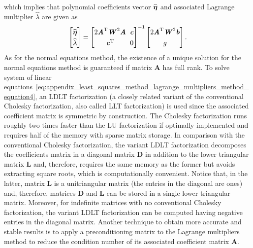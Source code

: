 which implies that polynomial coefficients vector $\widehat{\boldsymbol{\eta}}$ and associated Lagrange multiplier $\widehat{\lambda}$ are given as
\begin{equation}
\label{eq:appendix_least_squares_method_lagrange_multipliers_method_equation5}
\setlength\arraycolsep{0.1cm}
\renewcommand{\arraystretch}{1.3}
\begin{bmatrix}
\widehat{\bs{\eta}}\\
\widehat{\lambda}
\end{bmatrix}
=
\begin{bmatrix}
2\bm{A}^{\textrm{T}}\bm{W}^{2}\bm{A} & \bm{c}\\
\bm{c}^{\textrm{T}} & 0
\end{bmatrix}^{-1}
\begin{bmatrix}
2\bm{A}^{\textrm{T}}\bm{W}^{2}\bm{b}\\
g
\end{bmatrix}.
\end{equation}
As for the normal equations method, the existence of a unique solution for the normal equations method is guaranteed if matrix $\bm{A}$ has full rank.
To solve system of linear equations~\cref{eq:appendix_least_squares_method_lagrange_multipliers_method_equation4}, an LDLT factorization (a closely related variant of the conventional Cholesky factorization, also called LLT factorization) is used since the associated coefficient matrix is symmetric by construction.
The Cholesky factorization runs roughly two times faster than the LU factorization if optimally implemented and requires half of the memory with sparse matrix storage.
In comparison with the conventional Cholesky factorization, the variant LDLT factorization decomposes the coefficients matrix in a diagonal matrix $\bm{D}$ in addition to the lower triangular matrix $\bm{L}$ and, therefore, requires the same memory as the former but avoids extracting square roots, which is computationally convenient.
Notice that, in the latter, matrix $\bm{L}$ is a unitriangular matrix (the entries in the diagonal are ones) and, therefore, matrices $\bm{D}$ and $\bm{L}$ can be stored in a single lower triangular matrix.
Moreover, for indefinite matrices with no conventional Cholesky factorization, the variant LDLT factorization can be computed having negative entries in the diagonal matrix.
Another technique to obtain more accurate and stable results is to apply a preconditioning matrix to the Lagrange multipliers method to reduce the condition number of its associated coefficient matrix $\bm{A}$.

